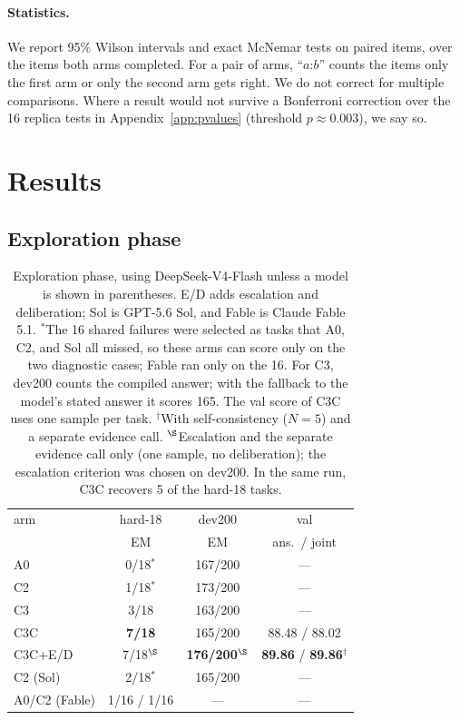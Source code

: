 \documentclass[11pt]{article}%
\begin{document}
\paragraph{Statistics.} We report 95\% Wilson intervals \citep{wilson1927} and exact McNemar tests \citep{mcnemar1947}
on paired items, over the items both arms completed. For a pair of arms,
``$a$:$b$'' counts the items only the first arm or only the second arm gets
right. We do not correct for multiple comparisons. Where a result would not
survive a Bonferroni correction \citep{dunn1961} over the 16 replica tests in
Appendix~\ref{app:pvalues} (threshold $p\approx0.003$), we say so.

\section{Results}
\label{sec:results}

\subsection{Exploration phase}

\begin{table}[t]
\centering
\small
\setlength{\tabcolsep}{4pt}
\begin{tabularx}{\columnwidth}{>{\raggedright\arraybackslash}Xccc}
\toprule
arm & hard-18 & dev200 & val \\
& EM & EM & ans.\ / joint \\
\midrule
\textsc{A0}   & 0/18$^\ast$ & 167/200 & --- \\
\textsc{C2}   & 1/18$^\ast$ & 173/200 & --- \\
\textsc{C3}   & 3/18 & 163/200 & --- \\
\textsc{C3C}  & \textbf{7/18} & 165/200 & 88.48 / 88.02 \\
\textsc{C3C}+E/D & 7/18$^\S$ & \textbf{176/200}$^\S$ & \textbf{89.86} / \textbf{89.86}$^\dagger$ \\
\midrule
\textsc{C2} (Sol) & 2/18$^\ast$ & 165/200 & --- \\
\textsc{A0}/\textsc{C2} (Fable) & 1/16 / 1/16 & --- & --- \\
\bottomrule
\end{tabularx}
\caption{Exploration phase, using DeepSeek-V4-Flash unless a model is shown in
parentheses. E/D adds escalation and deliberation; Sol is GPT-5.6 Sol, and
Fable is Claude Fable 5.1. $^\ast$The 16 shared failures were selected as tasks
that \textsc{A0}, \textsc{C2}, and Sol all missed, so these arms can score only
on the two diagnostic cases; Fable ran only on the 16. For \textsc{C3},
dev200 counts the compiled answer; with the fallback to the model's stated
answer it scores 165. The val score of \textsc{C3C} uses one sample per task.
$^\dagger$With self-consistency ($N{=}5$) and a separate evidence call.
$^\S$Escalation and the separate evidence call only (one sample, no
deliberation); the escalation criterion was chosen on dev200. In the same run,
\textsc{C3C} recovers 5 of the hard-18 tasks.}
\label{tab:explore}
\end{table}
\end{document}
